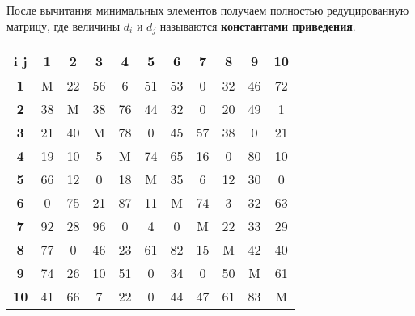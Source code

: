 \documentclass[17pt]{extarticle}
\begin{document}
После вычитания минимальных элементов получаем полностью редуцированную матрицу, где величины \( d_i \) и \( d_j \) называются \textbf{константами приведения}.

\begin{table}[H]
    \centering
    \begin{tabular}{|c|c|c|c|c|c|c|c|c|c|c|}
        \hline
        \textbf{i j} & \textbf{1} & \textbf{2} & \textbf{3} & \textbf{4} & \textbf{5} & \textbf{6} & \textbf{7} & \textbf{8} & \textbf{9} & \textbf{10} \\ \hline
        \textbf{1}   & M          & 22         & 56         & 6          & 51         & 53         & 0          & 32         & 46         & 72          \\ \hline
        \textbf{2}   & 38         & M          & 38         & 76         & 44         & 32         & 0          & 20         & 49         & 1           \\ \hline
        \textbf{3}   & 21         & 40         & M          & 78         & 0          & 45         & 57         & 38         & 0          & 21          \\ \hline
        \textbf{4}   & 19         & 10         & 5          & M          & 74         & 65         & 16         & 0          & 80         & 10          \\ \hline
        \textbf{5}   & 66         & 12         & 0          & 18         & M          & 35         & 6          & 12         & 30         & 0           \\ \hline
        \textbf{6}   & 0          & 75         & 21         & 87         & 11         & M          & 74         & 3          & 32         & 63          \\ \hline
        \textbf{7}   & 92         & 28         & 96         & 0          & 4          & 0          & M          & 22         & 33         & 29          \\ \hline
        \textbf{8}   & 77         & 0          & 46         & 23         & 61         & 82         & 15         & M          & 42         & 40          \\ \hline
        \textbf{9}   & 74         & 26         & 10         & 51         & 0          & 34         & 0          & 50         & M          & 61          \\ \hline
        \textbf{10}  & 41         & 66         & 7          & 22         & 0          & 44         & 47         & 61         & 83         & M           \\ \hline
    \end{tabular}
\end{table}
\end{document}
